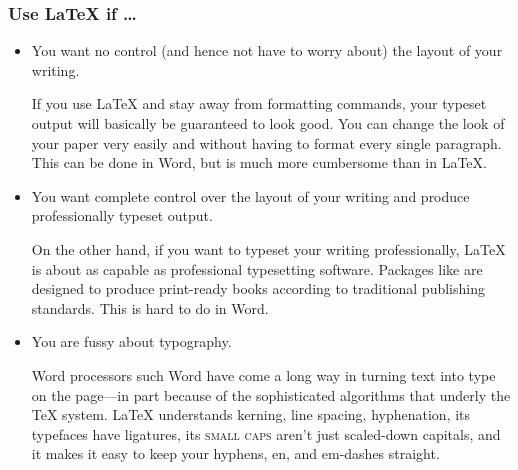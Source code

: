 \begin{frame}
\frametitle{Use \LaTeX{} if \dots}

\begin{itemize}
\item You want no control (and hence not have to worry about) the
  layout of your writing.

\begin{articleonly}
If you use \LaTeX{} and stay away from formatting commands, your
typeset output will basically be guaranteed to look good.  You can
change the look of your paper very easily and without having to format
every single paragraph.  This can be done in Word, but is much more
cumbersome than in \LaTeX.
\end{articleonly}

\item You want complete control over the layout of your writing and
  produce professionally typeset output.

\begin{articleonly}
On the other hand, if you want to typeset your writing professionally,
\LaTeX{} is about as capable as professional typesetting
software. Packages like \cite{memoir} are designed to produce
print-ready books according to traditional publishing standards. This
is hard to do in Word.
\end{articleonly}

\item You are fussy about typography.

\begin{articleonly}
Word processors such Word have come a long way in turning text into
type on the page---in part because of the sophisticated algorithms
that underly the \TeX{} system.  \LaTeX{} understands kerning, line
spacing, hyphenation, its typefaces have ligatures, its \textsc{small
  caps} aren't just scaled-down capitals, and it makes it easy to keep
your hyphens, en, and em-dashes straight.
\end{articleonly}
\end{itemize}

\end{frame}




